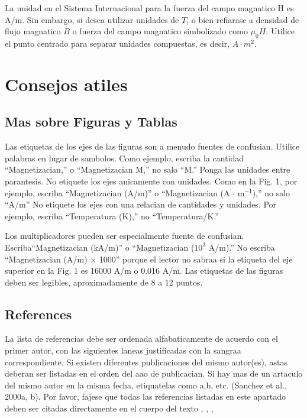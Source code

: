 \documentclass[5p,times,authoryear]{elsarticle}
\begin{document}
La unidad en el Sistema Internacional para la fuerza del campo
magnatico H es A/m. Sin embargo, si desea utilizar unidades de $T$,
o bien refiarase a densidad de flujo magnatico $B$ o fuerza del
campo magnatico simbolizado como $\mu_0 H$. Utilice el punto
centrado para separar unidades compuestas,  es decir, $A\cdot m^2$.

\section{Consejos atiles}

\subsection{Mas sobre Figuras y Tablas}

Las etiquetas de los ejes de las figuras son a menudo fuentes de
confusian. Utilice palabras en lugar de sambolos. Como ejemplo,
escriba la cantidad ``Magnetizacian,'' o ``Magnetizacian M,'' no
salo ``M.'' Ponga las unidades entre parantesis. No etiquete los
ejes anicamente con unidades. Como en la Fig. 1, por ejemplo,
escriba ``Magnetizacian (A/m)'' o ``Magnetizacian (A $\cdot$
m$^{-1}$),'' no salo ``A/m'' No etiquete los ejes con una relacian
de cantidades y unidades. Por ejemplo, escriba ``Temperatura (K),''
no ``Temperatura/K.''

Los multiplicadores pueden ser especialmente fuente de confusian.
Escriba``Magnetizacian (kA/m)'' o ``Magnetizacian ($10^3$ A/m).'' No
escriba ``Magnetizacian (A/m) $\times$ 1000'' porque el lector no
sabraa si la etiqueta del eje superior en la Fig. 1 es 16000 A/m o
0.016 A/m. Las etiquetas de las figuras deben ser legibles,
aproximadamente de 8 a 12 puntos.

\subsection{References} %

La lista de referencias debe ser ordenada alfabaticamente
de acuerdo con el primer autor, con las siguientes laneas justificadas con la sangraa correspondiente.
Si existen diferentes publicaciones del mismo autor(es), astas deberan ser listadas en el orden del
aao de publicacian. Si hay mas de un artaculo del mismo autor en la misma fecha,
etiquatelas como a,b, etc. (Sanchez et al., 2000a, b). Por favor,
fajese que todas las referencias \citep{Garcia:2007}
listadas en este apartado \citep{Garcia:2008}
deben ser citadas directamente en el cuerpo del texto \citep{Garcia:2004}, \citep{Dog:58},
\citep{Keo:58},
\end{document}
